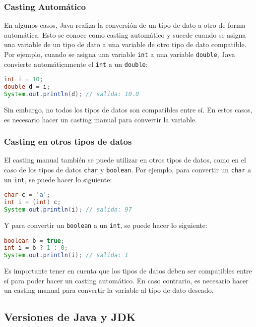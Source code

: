 \documentclass{article}
\begin{document}
\subsubsection{Casting Automático}

En algunos casos, Java realiza la conversión de un tipo de dato a otro de forma automática. Esto se conoce como casting automático y sucede cuando se asigna una variable de un tipo de dato a una variable de otro tipo de dato compatible. Por ejemplo, cuando se asigna una variable \texttt{int} a una variable \texttt{double}, Java convierte automáticamente el \texttt{int} a un \texttt{double}:

\begin{lstlisting}[language=Java]
int i = 10;
double d = i;
System.out.println(d); // salida: 10.0
\end{lstlisting}

Sin embargo, no todos los tipos de datos son compatibles entre sí. En estos casos, es necesario hacer un casting manual para convertir la variable.

\subsubsection{Casting en otros tipos de datos}

El casting manual también se puede utilizar en otros tipos de datos, como en el caso de los tipos de datos \texttt{char} y \texttt{boolean}. Por ejemplo, para convertir un \texttt{char} a un \texttt{int}, se puede hacer lo siguiente:

\begin{lstlisting}[language=Java]
char c = 'a';
int i = (int) c;
System.out.println(i); // salida: 97
\end{lstlisting}

Y para convertir un \texttt{boolean} a un \texttt{int}, se puede hacer lo siguiente:

\begin{lstlisting}[language=Java]
boolean b = true;
int i = b ? 1 : 0;
System.out.println(i); // salida: 1
\end{lstlisting}

Es importante tener en cuenta que los tipos de datos deben ser compatibles entre sí para poder hacer un casting automático. En caso contrario, es necesario hacer un casting manual para convertir la variable al tipo de dato deseado.

\subsection*{Versiones de Java y JDK}
\end{document}
